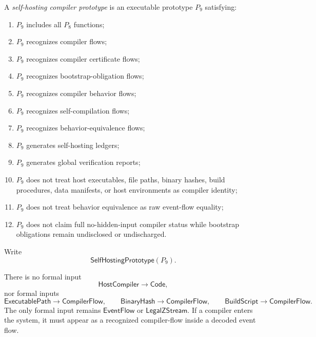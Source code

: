 \begin{definition}
\label{def:self-hosting-p9-prototype}
A \emph{self-hosting compiler prototype} is an executable prototype $P_9$ satisfying:
\begin{enumerate}
\item $P_9$ includes all $P_8$ functions;
\item $P_9$ recognizes compiler flows;
\item $P_9$ recognizes compiler certificate flows;
\item $P_9$ recognizes bootstrap-obligation flows;
\item $P_9$ recognizes compiler behavior flows;
\item $P_9$ recognizes self-compilation flows;
\item $P_9$ recognizes behavior-equivalence flows;
\item $P_9$ generates self-hosting ledgers;
\item $P_9$ generates global verification reports;
\item $P_9$ does not treat host executables, file paths, binary hashes, build procedures, data manifests, or host environments as compiler identity;
\item $P_9$ does not treat behavior equivalence as raw event-flow equality;
\item $P_9$ does not claim full no-hidden-input compiler status while bootstrap obligations remain undisclosed or undischarged.
\end{enumerate}
Write
$$
  \mathsf{SelfHostingPrototype}(P_9).
$$
\end{definition}

\begin{principle}
\label{prin:self-hosting-compiler-not-input}
There is no formal input
$$
  \mathsf{HostCompiler}\to\mathsf{Code},
$$
nor formal inputs
$$
  \mathsf{ExecutablePath}\to\mathsf{CompilerFlow},
  \qquad
  \mathsf{BinaryHash}\to\mathsf{CompilerFlow},
  \qquad
  \mathsf{BuildScript}\to\mathsf{CompilerFlow}.
$$
The only formal input remains $\mathsf{EventFlow}$ or $\mathsf{LegalZStream}$. If a compiler enters the system, it must appear as a recognized compiler-flow inside a decoded event flow.
\end{principle}

